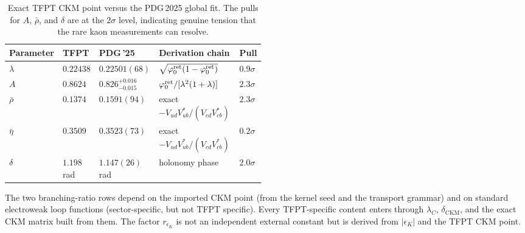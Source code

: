 \begin{table}[ht]
\centering
\small
\begin{tabularx}{\linewidth}{@{}>{\raggedright\arraybackslash}p{0.14\linewidth}>{\centering\arraybackslash}p{0.12\linewidth}>{\centering\arraybackslash}p{0.14\linewidth}>{\raggedright\arraybackslash}Y>{\centering\arraybackslash}p{0.09\linewidth}@{}}
\toprule
Parameter & TFPT & PDG\,'25 & Derivation chain & Pull \\
\midrule
$\lambda$ & $\num{0.22438}$ & $0.22501(68)$ & $\sqrt{\varphi_{0}^{\mathrm{ret}}(1-\varphi_{0}^{\mathrm{ret}})}$ & $0.9\sigma$ \\
$A$ & $\num{0.8624}$ & $0.826^{+0.016}_{-0.015}$ & $\varphi_{0}^{\mathrm{ret}}/[\lambda^2(1+\lambda)]$ & $2.3\sigma$ \\
$\bar\rho$ & $\num{0.1374}$ & $0.1591(94)$ & exact $-V_{ud}V_{ub}^*/(V_{cd}V_{cb}^*)$ & $2.3\sigma$ \\
$\bar\eta$ & $\num{0.3509}$ & $0.3523(73)$ & exact $-V_{ud}V_{ub}^*/(V_{cd}V_{cb}^*)$ & $0.2\sigma$ \\
$\delta$ & $\num{1.198}$ rad & $1.147(26)$ rad & holonomy phase & $2.0\sigma$ \\
\bottomrule
\end{tabularx}
\caption{Exact TFPT CKM point versus the PDG\,2025 \cite{PDG2025} global fit.
The pulls for $A$, $\bar\rho$, and $\delta$ are at the $2\sigma$ level,
indicating genuine tension that the rare kaon measurements can resolve.}
\label{tab:wolfenstein}
\end{table}

The two branching-ratio rows depend on the imported CKM point
(from the kernel seed and the transport grammar) and on standard
electroweak loop functions (sector-specific, but not TFPT specific).
Every TFPT-specific content enters through $\lambda_C$,
$\delta_{\mathrm{CKM}}$, and the exact CKM matrix built from them.
The factor $r_{\epsilon_K}$ is not an independent external constant but
is derived from $|\epsilon_K|$ and the TFPT CKM point.


